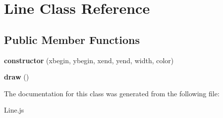 \hypertarget{class_line}{}\section{Line Class Reference}
\label{class_line}
\subsection*{Public Member Functions}
\begin{DoxyCompactItemize}
\item 
\mbox{\label{class_line_a42548202a23b16d944dee737d2d80c6e}} 
{\bfseries constructor} (xbegin, ybegin, xend, yend, width, color)
\item 
\mbox{\label{class_line_a00951eb9a97cd51f912ece50b2b963d0}} 
{\bfseries draw} ()
\end{DoxyCompactItemize}


The documentation for this class was generated from the following file\+:\begin{DoxyCompactItemize}
\item 
Line.\+js\end{DoxyCompactItemize}
